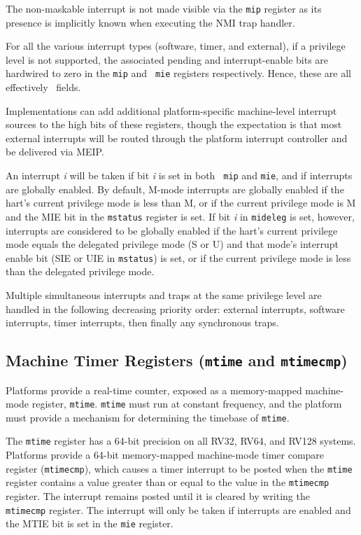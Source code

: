 \begin{commentary}
The non-maskable interrupt is not made visible via the {\tt mip}
register as its presence is implicitly known when executing the NMI
trap handler.
\end{commentary}

For all the various interrupt types (software, timer, and external),
if a privilege level is not supported, the associated pending and
interrupt-enable bits are hardwired to zero in the {\tt mip} and {\tt
  mie} registers respectively.  Hence, these are all effectively
\warl\ fields.

\begin{commentary}
Implementations can add additional platform-specific machine-level
interrupt sources to the high bits of these registers, though the
expectation is that most external interrupts will be routed through
the platform interrupt controller and be delivered via MEIP.
\end{commentary}

An interrupt {\em i} will be taken if bit {\em i} is set in both {\tt
  mip} and {\tt mie}, and if interrupts are globally enabled.  By
default, M-mode interrupts are globally enabled if the hart's current
privilege mode is less than M, or if the current privilege mode is M
and the MIE bit in the {\tt mstatus} register is set.  If bit {\em i}
in {\tt mideleg} is set, however, interrupts are considered to be
globally enabled if the hart's current privilege mode equals the
delegated privilege mode (S or U) and that mode's interrupt enable
bit (SIE or UIE in {\tt mstatus}) is set, or if the current
privilege mode is less than the delegated privilege mode.

Multiple simultaneous interrupts and traps at the same privilege level
are handled in the following decreasing priority order: external
interrupts, software interrupts, timer interrupts, then finally any
synchronous traps.

\subsection{Machine Timer Registers ({\tt mtime} and {\tt mtimecmp})}

Platforms provide a real-time counter, exposed as a memory-mapped
machine-mode register, {\tt mtime}.  {\tt mtime} must run at constant
frequency, and the platform must provide a mechanism for determining
the timebase of {\tt mtime}.

The {\tt mtime} register has a 64-bit precision on all RV32, RV64, and
RV128 systems.  Platforms provide a 64-bit memory-mapped machine-mode
timer compare register ({\tt mtimecmp}), which causes a timer
interrupt to be posted when the {\tt mtime} register contains a value
greater than or equal to the value in the {\tt mtimecmp} register.
The interrupt remains posted until it is cleared by writing the {\tt
  mtimecmp} register.  The interrupt will only be taken if interrupts
are enabled and the MTIE bit is set in the {\tt mie} register.

